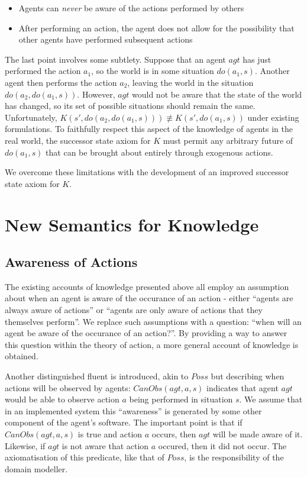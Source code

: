 \documentclass[letterpaper]{article}
\begin{document}
\begin{itemize}
\item Agents can \emph{never} be aware of the actions performed by others 
\item After performing an action, the agent does not allow for the possibility
that other agents have performed subsequent actions 
\end{itemize}
The last point involves some subtlety. Suppose that an agent $agt$
has just performed the action $a_{1}$, so the world is in some situation
$do(a_{1},s)$. Another agent then performs the action $a_{2}$, leaving
the world in the situation $do(a_{2},do(a_{1},s))$. However, $agt$
would not be aware that the state of the world has changed, so its
set of possible situations should remain the same. Unfortunately,
$K(s',do(a_{2},do(a_{1},s)))\not\equiv K(s',do(a_{1},s))$ under existing
formulations. To faithfully respect this aspect of the knowledge of
agents in the real world, the successor state axiom for $K$ must
permit any arbitrary future of $do(a_{1},s)$ that can be brought
about entirely through exogenous actions.

We overcome these limitations with the development of an improved
successor state axiom for $K$.


\section{New Semantics for Knowledge}


\subsection{Awareness of Actions}

The existing accounts of knowledge presented above all employ an assumption
about when an agent is aware of the occurance of an action - either
{}``agents are always aware of actions'' or {}``agents are only
aware of actions that they themselves perform''. We replace such
assumptions with a question: {}``when will an agent be aware of the
occurance of an action?''. By providing a way to answer this question
within the theory of action, a more general account of knowledge is
obtained.

Another distinguished fluent is introduced, akin to $Poss$ but describing
when actions will be observed by agents: $CanObs(agt,a,s)$ indicates
that agent $agt$ would be able to observe action $a$ being performed
in situation $s$. We assume that in an implemented system this {}``awareness''
is generated by some other component of the agent's software. The
important point is that if $CanObs(agt,a,s)$ is true and action $a$
occurs, then $agt$ will be made aware of it. Likewise, if $agt$
is not aware that action $a$ occured, then it did not occur. The
axiomatisation of this predicate, like that of $Poss$, is the responsibility
of the domain modeller.
\end{document}
